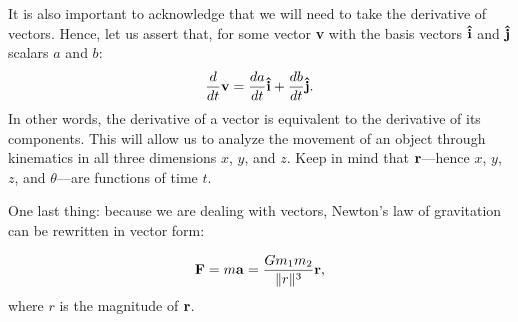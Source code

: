 It is also important to acknowledge that we will need to take the derivative of vectors. Hence, let us assert that, for some vector \textbf{v} with the basis vectors $\uvec{i}$ and $\uvec{j}$ scalars $a$ and $b$:
\begin{equation*}
	\frac{d}{dt}\bvec{v} = \frac{da}{dt}\uvec{i} + \frac{db}{dt}\uvec{j} \text{.}
\end{equation*}
In other words, the derivative of a vector is equivalent to the derivative of its components.
This will allow us to analyze the movement of an object through kinematics in all three dimensions $x$, $y$, and $z$. Keep in mind that $\bm{\mathbf{r}}$---hence $x$, $y$, $z$, and $\theta$---are functions of time $t$.

\newpage

One last thing: because we are dealing with vectors, Newton's law of gravitation can be rewritten in vector form:

\begin{equation*}
	\bm{\mathbf{F}} = m\bm{\mathbf{a}} = \frac{Gm_1m_2}{\|r\|^3}\bm{\mathbf{r}} \text{,}
\end{equation*}
where $r$ is the magnitude of $\bm{\mathbf{r}}$.

